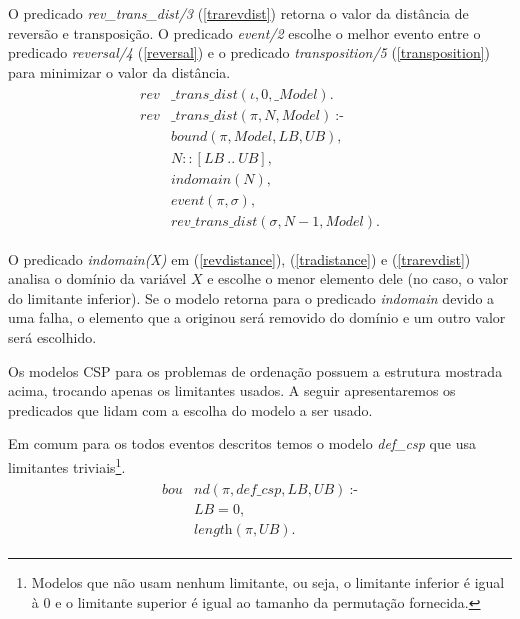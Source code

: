 O predicado \textit{rev\_trans\_dist/3} (\ref{trarevdist}) retorna o
valor da distância de reversão e transposição. O predicado
\textit{event/2} escolhe o melhor evento entre o predicado
\textit{reversal/4} (\ref{reversal}) e o predicado
\textit{transposition/5} (\ref{transposition}) para minimizar o valor da
distância.
\begin{align}
  \label{trarevdist}
  \begin{split}
  \textit{rev}&\textit{\_trans\_dist}(\iota, 0, \_Model). \\
  \textit{rev}&\textit{\_trans\_dist}(\pi, N, Model)~\text{:-} \\
  &\textit{bound}(\pi, Model, LB, UB), \\
  &N :: [LB~..~UB], \\
  &\textit{indomain}(N),  \\
  &\textit{event}(\pi, \sigma),  \\
  &\textit{rev\_trans\_dist}(\sigma, N-1, Model). 
  \end{split}
\end{align}

O predicado \textit{indomain(X)} em (\ref{revdistance}),
(\ref{tradistance}) e (\ref{trarevdist}) analisa o domínio da variável
$X$ e escolhe o menor elemento dele (no caso, o valor do limitante
inferior). Se o modelo retorna para o predicado \textit{indomain} devido
a uma falha, o elemento que a originou será removido do domínio e um
outro valor será escolhido.

Os modelos CSP para os problemas de ordenação possuem a estrutura
mostrada acima, trocando apenas os limitantes usados. A seguir
apresentaremos os predicados que lidam com a escolha do modelo a ser
usado.

Em comum para os todos eventos descritos temos o modelo
\textit{def\_csp} que usa limitantes triviais\footnote{Modelos que não
usam nenhum limitante, ou seja, o limitante inferior é igual à $0$ e
o limitante superior é igual ao tamanho da permutação fornecida.}.
\begin{align}
  \label{bound_def}
  \begin{split}
  \textit{bou}&\textit{nd}(\pi, def\_csp, LB, UB)~\text{:-} \\
  &LB = 0, \\
  &\textit{length}(\pi, UB).
  \end{split}
\end{align}

